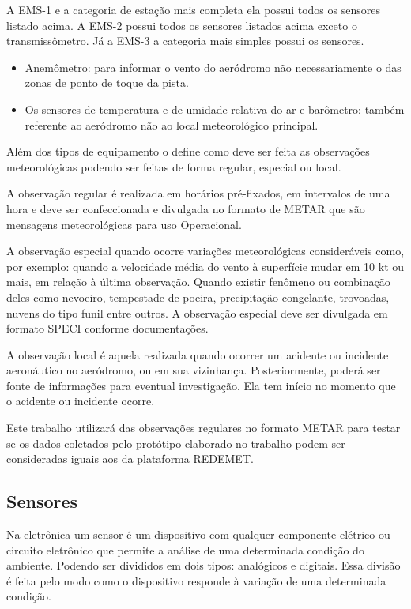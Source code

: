 A EMS-1 e a categoria de estação mais completa ela possui todos os sensores listado acima. A EMS-2 possui todos os sensores listados acima exceto o transmissômetro. Já a EMS-3 a categoria mais simples possui os sensores.
\begin{itemize}
    \item Anemômetro: para informar o vento do aeródromo não necessariamente o das zonas de ponto de toque da pista.
    \item Os sensores de temperatura e de umidade relativa do ar e barômetro: também referente ao aeródromo não ao local meteorológico principal.
\end{itemize}

Além dos tipos de equipamento o \cite{DECEA} define como deve ser feita as observações meteorológicas podendo ser feitas de forma regular, especial ou local.

A observação regular é realizada em horários pré-fixados, em intervalos de uma hora e deve ser confeccionada e divulgada no formato de METAR que são mensagens meteorológicas para uso Operacional.

A observação especial quando ocorre variações meteorológicas consideráveis como, por exemplo: quando a velocidade média do vento à superfície mudar em 10 kt ou mais, em relação à última observação. Quando existir fenômeno ou combinação deles como nevoeiro, tempestade de poeira, precipitação congelante, trovoadas, nuvens do tipo funil entre outros. A observação especial deve ser divulgada em formato SPECI conforme documentações.

A observação local é aquela realizada quando ocorrer um acidente ou incidente aeronáutico no aeródromo, ou em sua vizinhança. Posteriormente, poderá ser fonte de informações para eventual investigação. Ela tem início no momento que o acidente ou incidente ocorre. 

Este trabalho utilizará das observações regulares no formato METAR para testar se os dados coletados pelo protótipo elaborado no trabalho podem ser consideradas iguais aos da plataforma REDEMET.




\subsection{Sensores}

Na eletrônica um sensor é um dispositivo com qualquer componente elétrico ou circuito eletrônico que permite a análise de uma determinada condição do ambiente\cite{neto2020eletronica}. Podendo ser
divididos em dois tipos: analógicos e digitais. Essa divisão é feita pelo modo como o dispositivo responde à variação de uma determinada condição.

